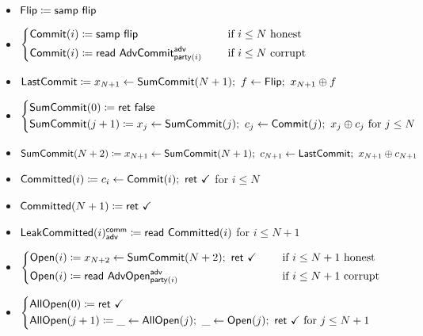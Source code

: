 \begin{itemize}
\item $\mathsf{Flip} \coloneqq \mathsf{samp} \ \mathsf{flip}$
\item {\color{blue} $\begin{cases*} \Commit(i) \coloneqq \samp{\flip} & \hspace{10pt} \text{if $i \leq N$ honest} \\ \Commit(i) \coloneqq \read{\AdvCommit^\adv_{\party(i)}} & \hspace{10pt} \text{if $i \leq N$ corrupt} \end{cases*}$}
\item {\color{blue} $\mathsf{LastCommit} \coloneqq x_{N+1} \leftarrow \mathsf{SumCommit}(N+1); \ f \leftarrow \mathsf{Flip}; \ x_{N+1} \oplus f$}
\item {\color{blue} $\begin{cases*} \SumCommit(0) \coloneqq \ret{\false} \\ \SumCommit(j+1) \coloneqq x_j \leftarrow \SumCommit(j); \ c_j \leftarrow \Commit(j); \ x_j \oplus c_j \text{ for $j \leq N$} \end{cases*}$}
\item {\color{blue} $\SumCommit(N+2) \coloneqq x_{N+1} \leftarrow \SumCommit(N+1); \ c_{N+1} \leftarrow \LastCommit; \ x_{N+1} \oplus c_{N+1}$}
\item {\color{magenta} $\mathsf{Committed}(i) \coloneqq c_i \leftarrow \mathsf{Commit}(i); \ \mathsf{ret} \ \checkmark$ for $i \leq N$}
\item {\color{magenta} $\mathsf{Committed}(N+1) \coloneqq \mathsf{ret} \ \checkmark$}
\item {\color{magenta} $\mathsf{LeakCommitted}(i)^{\mathsf{comm}}_{\mathsf{adv}} \coloneqq \mathsf{read} \ \mathsf{Committed}(i)$ for $i \leq N+1$}
\item {\color{teal} $\begin{cases*} \Open(i) \coloneqq x_{N+2} \leftarrow \SumCommit(N+2); \ \ret{\checkmark} & \hspace{10pt} \text{if $i \leq N+1$ honest} \\ \Open(i) \coloneqq \read{\AdvOpen^\adv_{\party(i)}} & \hspace{10pt} \text{if $i \leq N+1$ corrupt} \end{cases*}$}
\item {\color{teal} $\begin{cases*} \AllOpen(0) \coloneqq \ret{\checkmark} \\ \AllOpen(j+1) \coloneqq \_ \leftarrow \AllOpen(j); \ \_ \leftarrow \Open(j); \ \ret{\checkmark} \text{ for $j \leq N+1$} \end{cases*}$}

\end{itemize}
